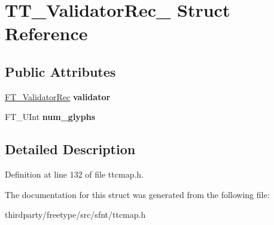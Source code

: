 \hypertarget{struct_t_t___validator_rec__}{}\section{T\+T\+\_\+\+Validator\+Rec\+\_\+ Struct Reference}
\label{struct_t_t___validator_rec__}
\subsection*{Public Attributes}
\begin{DoxyCompactItemize}
\item 
\mbox{\label{struct_t_t___validator_rec___a9faa8add892ddf72fdadae3a53a87e14}} 
\hyperlink{struct_f_t___validator_rec__}{F\+T\+\_\+\+Validator\+Rec} {\bfseries validator}
\item 
\mbox{\label{struct_t_t___validator_rec___adfacba73a1fc72ab51d5a34a6366bb52}} 
F\+T\+\_\+\+U\+Int {\bfseries num\+\_\+glyphs}
\end{DoxyCompactItemize}


\subsection{Detailed Description}


Definition at line 132 of file ttcmap.\+h.



The documentation for this struct was generated from the following file\+:\begin{DoxyCompactItemize}
\item 
thirdparty/freetype/src/sfnt/ttcmap.\+h\end{DoxyCompactItemize}
